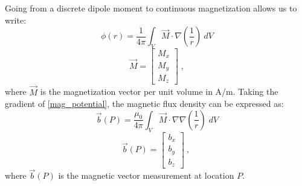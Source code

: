 %
Going from a discrete dipole moment to continuous magnetization allows us to write:
\begin{equation}\label{mag_potential}
	 \phi(r) = \frac{1}{4\pi} \int_{V} \vec M \cdot \nabla \left( { \frac{1}{r} } \right) \: dV 
\end{equation}
\begin{equation*}
	\vec M = 
	\begin{bmatrix}
		M_x \\
		M_y \\
		M_z 
	\end{bmatrix} \;,
\end{equation*}
where  $\vec M$ is the magnetization vector per unit volume in A/m.
Taking the gradient of \ref{mag_potential}, the magnetic flux density can be expressed as:
\begin{equation} \label{b_integral}
 	\vec b (P) = \frac{\mu_0}{4\pi}  \int_{V}   \vec M \cdot \nabla \nabla \left(\frac{1}{r}\right) \; dV
\end{equation}
\begin{equation*}
	\vec b(P) = 
	\begin{bmatrix}
		b_{x} \\
		b_{y} \\
		b_{z} 
	\end{bmatrix} \:,\:
\end{equation*}
where $\vec b(P)$ is the magnetic vector measurement at location $P$.

